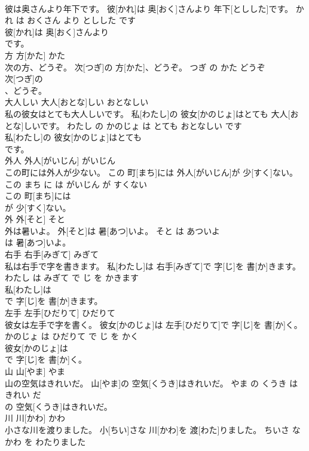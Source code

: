 \documentclass[8pt]{extreport}
\begin{document}
\begin{CJK}{UTF8}{min}
\\	彼は奥さんより年下です。	彼[かれ]は 奥[おく]さんより 年下[としした]です。	かれ は おくさん より としした です	
\\	彼[かれ]は 奥[おく]さんより
\\	です。			
\\	方	方[かた]	かた	
\\	次の方、どうぞ。	次[つぎ]の 方[かた]、どうぞ。	つぎ の かた どうぞ	
\\	次[つぎ]の
\\	、どうぞ。			
\\	大人しい	大人[おとな]しい	おとなしい	
\\	私の彼女はとても大人しいです。	私[わたし]の 彼女[かのじょ]はとても 大人[おとな]しいです。	わたし の かのじょ は とても おとなしい です	
\\	私[わたし]の 彼女[かのじょ]はとても
\\	です。			
\\	外人	外人[がいじん]	がいじん	
\\	この町には外人が少ない。	この 町[まち]には 外人[がいじん]が 少[すく]ない。	この まち に は がいじん が すくない	
\\	この 町[まち]には
\\	が 少[すく]ない。			
\\	外	外[そと]	そと	
\\	外は暑いよ。	外[そと]は 暑[あつ]いよ。	そと は あついよ	
\\	は 暑[あつ]いよ。			
\\	右手	右手[みぎて]	みぎて	
\\	私は右手で字を書きます。	私[わたし]は 右手[みぎて]で 字[じ]を 書[か]きます。	わたし は みぎて で じ を かきます	
\\	私[わたし]は
\\	で 字[じ]を 書[か]きます。			
\\	左手	左手[ひだりて]	ひだりて	
\\	彼女は左手で字を書く。	彼女[かのじょ]は 左手[ひだりて]で 字[じ]を 書[か]く。	かのじょ は ひだりて で じ を かく	
\\	彼女[かのじょ]は
\\	で 字[じ]を 書[か]く。			
\\	山	山[やま]	やま	
\\	山の空気はきれいだ。	山[やま]の 空気[くうき]はきれいだ。	やま の くうき は きれい だ	
\\	の 空気[くうき]はきれいだ。			
\\	川	川[かわ]	かわ	
\\	小さな川を渡りました。	小[ちい]さな 川[かわ]を 渡[わた]りました。	ちいさ な かわ を わたりました	

\end{CJK}
\end{document}
